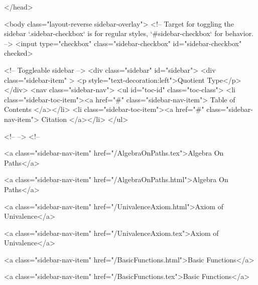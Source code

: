   
</head>




  <body class="layout-reverse sidebar-overlay">
    <!-- Target for toggling the sidebar `.sidebar-checkbox` is for regular
     styles, `#sidebar-checkbox` for behavior. -->
<input type="checkbox" class="sidebar-checkbox" id="sidebar-checkbox" checked>

<!-- Toggleable sidebar -->
<div class="sidebar" id="sidebar">
  <div class="sidebar-item" >
    <p style="text-decoration:left">Quotient Type</p>
  </div>
  <nav class="sidebar-nav">
    <ul id="toc-id" class="toc-class">
  <li class="sidebar-toc-item"><a href="#" class="sidebar-nav-item"> Table of Contents </a></li>
  <li class="sidebar-toc-item"><a href="#" class="sidebar-nav-item"> Citation </a></li>
</ul>


    <!--  -->
    <!-- 
      
    
      
    
      
    
      
        
      
    
      
        
          <a class="sidebar-nav-item" href="/AlgebraOnPaths.tex">Algebra On Paths</a>
        
      
    
      
        
          <a class="sidebar-nav-item" href="/AlgebraOnPaths.html">Algebra On Paths</a>
        
      
    
      
        
          <a class="sidebar-nav-item" href="/UnivalenceAxiom.html">Axiom of Univalence</a>
        
      
    
      
        
          <a class="sidebar-nav-item" href="/UnivalenceAxiom.tex">Axiom of Univalence</a>
        
      
    
      
        
          <a class="sidebar-nav-item" href="/BasicFunctions.html">Basic Functions</a>
        
      
    
      
        
          <a class="sidebar-nav-item" href="/BasicFunctions.tex">Basic Functions</a>
        
      
    

